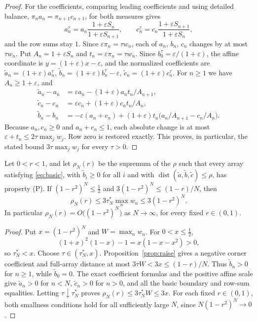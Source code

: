 \begin{proof}
For the coefficients, comparing leading coefficients and using detailed balance, $\pi_na_n=\pi_{n+1}c_{n+1}$, for both measures gives
\[
a_n^\tau=a_n\frac{1+\varepsilon S_n}{1+\varepsilon S_{n+1}},\qquad c_n^\tau=c_n\frac{1+\varepsilon S_{n+1}}{1+\varepsilon S_n},
\]
and the row sums stay $1$. Since $\varepsilon\pi_n=\tau w_n$, each of $a_n$, $b_n$, $c_n$ changes by at most $\tau w_n$. Put $A_n=1+\varepsilon S_n$ and $t_n=\varepsilon\pi_n=\tau w_n$. Since $b_0^\tau=\varepsilon/(1+\varepsilon)$, the affine coordinate is $y=(1+\varepsilon)x-\varepsilon$, and the normalized coefficients are $\widetilde a_n=(1+\varepsilon)a_n^\tau$, $\widetilde b_n=(1+\varepsilon)b_n^\tau-\varepsilon$, $\widetilde c_n=(1+\varepsilon)c_n^\tau$. For $n\geq1$ we have $A_n\geq1+\varepsilon$, and
\begin{align*}
\widetilde a_n-a_n&=\varepsilon a_n-(1+\varepsilon)a_nt_n/A_{n+1},\\
\widetilde c_n-c_n&=\varepsilon c_n+(1+\varepsilon)c_nt_n/A_n,\\
\widetilde b_n-b_n&=-\varepsilon(a_n+c_n)+(1+\varepsilon)t_n\bigl(a_n/A_{n+1}-c_n/A_n\bigr).
\end{align*}
Because $a_n,c_n\geq0$ and $a_n+c_n\leq1$, each absolute change is at most $\varepsilon+t_n\leq2\tau\max_jw_j$. Row zero is restored exactly. This proves, in particular, the stated bound $3\tau\max_jw_j$ for every $\tau>0$.
\end{proof}

\begin{corollary}\label{cor:radius-exp}
Let $0<r<1$, and let $\rho_N(r)$ be the supremum of the $\rho$ such that every array satisfying \eqref{eq:basic}, with $\widetilde b_i\geq0$ for all $i$ and with $\operatorname{dist}(\widetilde a,\widetilde b,\widetilde c)\leq\rho$, has property (P). If $(1-r^2)^N\leq\tfrac12$ and $3(1-r^2)^N\leq(1-r)/N$, then
\[
\rho_N(r)\leq3\tau_N^*\max_nw_n\leq3(1-r^2)^N.
\]
In particular $\rho_N(r)=O\bigl((1-r^2)^N\bigr)$ as $N\to\infty$, for every fixed $r\in(0,1)$.
\end{corollary}
\begin{proof}
Put $x=(1-r^2)^N$ and $W=\max_nw_n$. For $0<x\leq\tfrac12$,
\[
(1+x)^2(1-x)-1=x(1-x-x^2)>0,
\]
so $\tau_N^*<x$. Choose $\tau\in(\tau_N^*,x)$. Proposition~\ref{prop:raise} gives a negative corner coefficient and full-array distance at most $3\tau W<3x\leq(1-r)/N$. Thus $\widetilde b_n>0$ for $n\geq1$, while $\widetilde b_0=0$. The exact coefficient formulas and the positive affine scale give $\widetilde a_n>0$ for $n<N$, $\widetilde c_n>0$ for $n>0$, and all the basic boundary and row-sum equalities. Letting $\tau\downarrow\tau_N^*$ proves $\rho_N(r)\leq3\tau_N^*W\leq3x$. For each fixed $r\in(0,1)$, both smallness conditions hold for all sufficiently large $N$, since $N(1-r^2)^N\to0$.
\end{proof}

